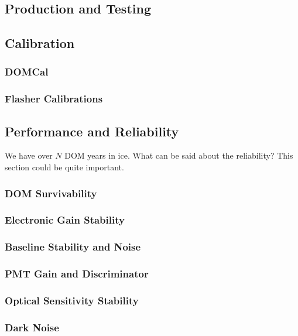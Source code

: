 \subsection{Production and Testing}

\subsection{Calibration}

\subsubsection{DOMCal}

\subsubsection{Flasher Calibrations}

\subsection{Performance and Reliability}
We have over $N$ DOM years in ice.  What can be said about 
the reliability?  This section could be quite important.

\subsubsection{DOM Survivability}

\subsubsection{Electronic Gain Stability}

\subsubsection{Baseline Stability and Noise}

\subsubsection{PMT Gain and Discriminator}

\subsubsection{Optical Sensitivity Stability}

\subsubsection{Dark Noise}


